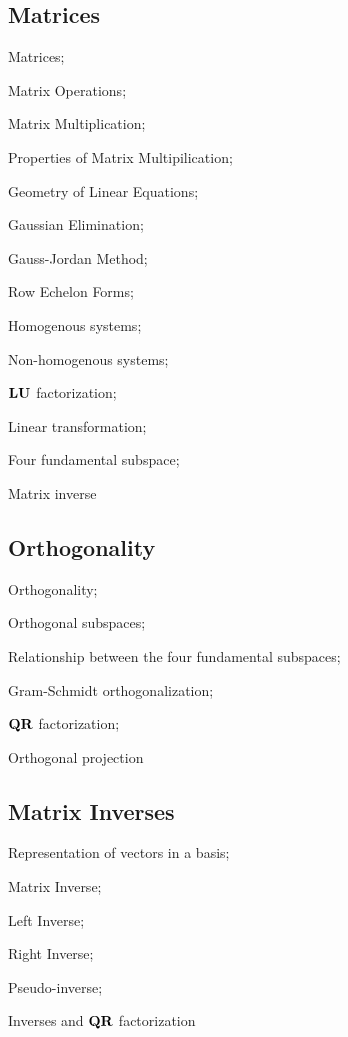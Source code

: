 \documentclass[fontsize=9pt]{scrbook}
\def\mf{\ensuremath\mathbf}
\begin{document}
\begin{multicols}{2}
\subsection*{Matrices}
\begin{enumerate*}
    \item Matrices;
    \item Matrix Operations;
    \item Matrix Multiplication;
    \item Properties of Matrix Multipilication;
    \item Geometry of Linear Equations;
    \item Gaussian Elimination;
    \item Gauss-Jordan Method;
    \item Row Echelon Forms;
    \item Homogenous systems;
    \item Non-homogenous systems;
    \item $\mf{LU}$ factorization;
    \item Linear transformation;
    \item Four fundamental subspace;
    \item Matrix inverse
\end{enumerate*}

\subsection*{Orthogonality}
\begin{enumerate*}
    \item Orthogonality;
    \item Orthogonal subspaces;
    \item Relationship between the four fundamental subspaces;
    \item Gram-Schmidt orthogonalization;
    \item $\mf{QR}$ factorization;
    \item Orthogonal projection
\end{enumerate*}


\subsection*{Matrix Inverses}
\begin{enumerate*}
    \item Representation of vectors in a basis;
    \item Matrix Inverse;
    \item Left Inverse;
    \item Right Inverse;
    \item Pseudo-inverse;
    \item Inverses and $\mf{QR}$ factorization
\end{enumerate*}


\end{multicols}
\end{document}
